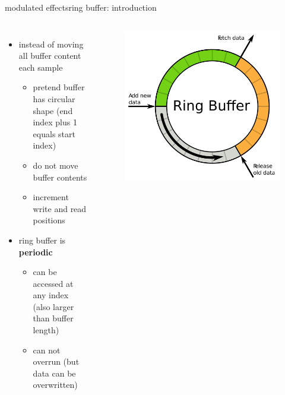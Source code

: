 		\begin{frame}{modulated effects}{ring buffer: introduction}
            \begin{columns}
			\begin{itemize}
				\item	instead of moving all buffer content each sample
					\begin{itemize}
                        \item   pretend buffer has circular shape (end index plus 1 equals start index)
						\item	do not move buffer contents
						\item	increment write and read positions
					\end{itemize}
                \bigskip
                \item<2->[$\Rightarrow$] ring buffer is \textbf{periodic} 
                    \begin{itemize}
                        \item   can be accessed at any index (also larger than buffer length)
                        \item   can not overrun (but data can be overwritten)
                    \end{itemize}
            \end{itemize}
                \begin{figure}
                    \includegraphics[width=\columnwidth]{graph/Ringbuffer}
                \end{figure}
            \end{columns}
		\end{frame}

